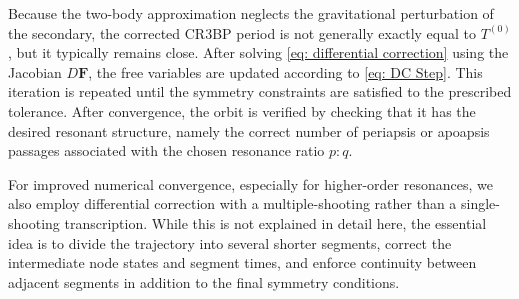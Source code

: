 Because the two-body approximation neglects the gravitational perturbation of the secondary, the corrected CR3BP period is not generally exactly equal to $T^{(0)}$, but it typically remains close. 
After solving \cref{eq: differential correction} using the Jacobian $D\boldsymbol{F}$, the free variables are updated according to \cref{eq: DC Step}. 
This iteration is repeated until the symmetry constraints are satisfied to the prescribed tolerance. 
After convergence, the orbit is verified by checking that it has the desired resonant structure, namely the correct number of periapsis or apoapsis passages associated with the chosen resonance ratio $p:q$.

For improved numerical convergence, especially for higher-order resonances, we also employ differential correction with a multiple-shooting rather than a single-shooting transcription. 
While this is not explained in detail here, the essential idea is to divide the trajectory into several shorter segments, correct the intermediate node states and segment times, and enforce continuity between adjacent segments in addition to the final symmetry conditions.